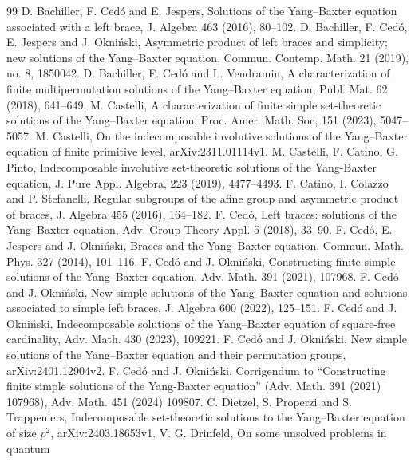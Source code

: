\documentclass[10pt]{article}
\begin{document}
\begin{thebibliography}{99}
\itemsep=-2pt
  D. Bachiller, F. Ced\'o and E. Jespers, Solutions of
the Yang--Baxter equation associated with a left brace,  J.
Algebra 463 (2016), 80--102.
 D. Bachiller, F. Ced\'o, E. Jespers and J. Okni\'nski,
Asymmetric product of left braces and simplicity; new solutions of
the Yang--Baxter equation, Commun. Contemp. Math. 21 (2019), no.
8, 1850042.
 D. Bachiller, F. Ced\'o and L. Vendramin,  A characterization
of finite multipermutation solutions of the Yang--Baxter equation,
Publ. Mat. 62 (2018), 641--649.
 M. Castelli, A characterization of finite simple set-theoretic
solutions of the Yang--Baxter equation, Proc. Amer. Math. Soc, 151
(2023), 5047--5057.
 M. Castelli, On the indecomposable involutive solutions of the
Yang--Baxter equation of finite primitive level, arXiv:2311.01114v1.
 M. Castelli, F. Catino, G. Pinto, Indecomposable involutive set-theoretic solutions of the Yang-Baxter
equation, J. Pure Appl. Algebra, 223 (2019), 4477--4493.
 F. Catino, I. Colazzo and P. Stefanelli, Regular
subgroups of the afine group and asymmetric product of braces,  J.
Algebra 455 (2016), 164--182.
 F. Ced\'o,  Left braces: solutions of the Yang--Baxter equation,
Adv. Group Theory Appl. 5 (2018), 33--90.
 F. Ced\'o, E. Jespers and J. Okni\'nski, Braces and the Yang--Baxter
equation, Commun. Math. Phys. 327 (2014), 101--116.
 F. Ced\'o and J. Okni\'{n}ski, Constructing finite simple solutions of
the Yang--Baxter equation, Adv. Math. 391 (2021), 107968.
  F. Ced\'o and J. Okni\'{n}ski, New simple solutions of the Yang--Baxter
equation and solutions associated to simple left braces, J.
Algebra 600 (2022), 125--151.
 F. Ced\'o and J. Okni\'{n}ski, Indecomposable solutions of the Yang--Baxter equation
of square-free cardinality, Adv. Math. 430 (2023), 109221.
  F. Ced\'o and J. Okni\'{n}ski, New simple solutions of the Yang--Baxter equation and their permutation groups,
arXiv:2401.12904v2.
   F. Ced\'o and J. Okni\'{n}ski, Corrigendum to ``Constructing finite simple solutions of the Yang-Baxter
equation'' (Adv. Math. 391 (2021) 107968), Adv. Math. 451 (2024) 109807.
 C. Dietzel, S. Properzi and S. Trappeniers, Indecomposable set-theoretic solutions
to the Yang--Baxter equation of size $p^2$, arXiv:2403.18653v1.
 V. G. Drinfeld, On some unsolved problems in quantum

\end{thebibliography}
\end{document}
